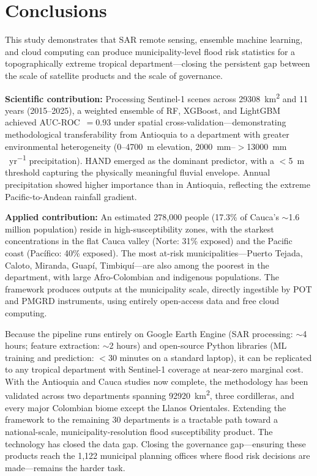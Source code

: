 \documentclass{article}
\begin{document}
\section{Conclusions}
\label{sec:conclusions}

This study demonstrates that SAR remote sensing, ensemble machine learning, and cloud computing can produce municipality-level flood risk statistics for a topographically extreme tropical department---closing the persistent gap between the scale of satellite products and the scale of governance.

\textbf{Scientific contribution:} Processing Sentinel-1 scenes across \SI{29308}{\kilo\metre\squared} and 11 years (2015--2025), a weighted ensemble of RF, XGBoost, and LightGBM achieved AUC-ROC~$= 0.93$ under spatial cross-validation---demonstrating methodological transferability from Antioquia \citep{EspinalMaya2026} to a department with greater environmental heterogeneity (0--\SI{4700}{\metre} elevation, \SI{2000}{mm}--$>$\SI{13000}{mm\,yr^{-1}} precipitation). HAND emerged as the dominant predictor, with a $<$\SI{5}{\metre} threshold capturing the physically meaningful fluvial envelope. Annual precipitation showed higher importance than in Antioquia, reflecting the extreme Pacific-to-Andean rainfall gradient.

\textbf{Applied contribution:} An estimated 278,000 people (17.3\% of Cauca's $\sim$1.6 million population) reside in high-susceptibility zones, with the starkest concentrations in the flat Cauca valley (Norte: 31\% exposed) and the Pacific coast (Pac\'ifico: 40\% exposed). The most at-risk municipalities---Puerto Tejada, Caloto, Miranda, Guap\'i, Timbiqu\'i---are also among the poorest in the department, with large Afro-Colombian and indigenous populations. The framework produces outputs at the municipality scale, directly ingestible by POT and PMGRD instruments, using entirely open-access data and free cloud computing.

Because the pipeline runs entirely on Google Earth Engine (SAR processing: $\sim$4 hours; feature extraction: $\sim$2 hours) and open-source Python libraries (ML training and prediction: $<$30 minutes on a standard laptop), it can be replicated to any tropical department with Sentinel-1 coverage at near-zero marginal cost. With the Antioquia and Cauca studies now complete, the methodology has been validated across two departments spanning \SI{92920}{\kilo\metre\squared}, three cordilleras, and every major Colombian biome except the Llanos Orientales. Extending the framework to the remaining 30 departments is a tractable path toward a national-scale, municipality-resolution flood susceptibility product. The technology has closed the data gap. Closing the governance gap---ensuring these products reach the 1,122 municipal planning offices where flood risk decisions are made---remains the harder task.
\end{document}
